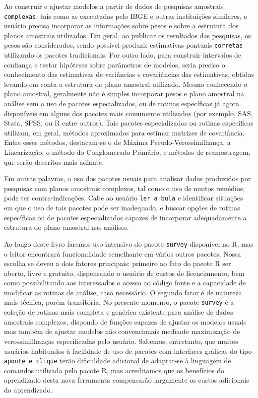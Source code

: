 \documentclass[]{book}
\theoremstyle{definition}
\theoremstyle{definition}
\theoremstyle{definition}
\theoremstyle{remark}
\begin{document}
Ao construir e ajustar modelos a partir de dados de pesquisas amostrais
\texttt{complexas}, tais como as executadas pelo IBGE e outras
instituições similares, o usuário precisa incorporar as informações
sobre pesos e sobre a estrutura dos planos amostrais utilizados. Em
geral, ao publicar os resultados das pesquisas, os pesos são
considerados, sendo possível produzir estimativas pontuais
\texttt{corretas} utilizando os pacotes tradicionais. Por outro lado,
para construir intervalos de confiança e testar hipóteses sobre
parâmetros de modelos, seria preciso o conhecimento das estimativas de
variâncias e covariâncias das estimativas, obtidas levando em conta a
estrutura do plano amostral utilizado. Mesmo conhecendo o plano
amostral, geralmente não é simples incorporar pesos e plano amostral na
análise sem o uso de pacotes especializados, ou de rotinas específicas
já agora disponíveis em alguns dos pacotes mais comumente utilizados
(por exemplo, SAS, Stata, SPSS, ou R entre outros). Tais pacotes
especializados ou rotinas específicas utilizam, em geral, métodos
aproximados para estimar matrizes de covariância. Entre esses métodos,
destacam-se o de Máxima Pseudo-Verossimilhança, a Linearização, o método
do Conglomerado Primário, e métodos de reamostragem, que serão descritos
mais adiante.

Em outras palavras, o uso dos pacotes usuais para analisar dados
produzidos por pesquisas com planos amostrais complexos, tal como o uso
de muitos remédios, pode ter contra-indicações. Cabe ao usuário
\texttt{ler\ a\ bula} e identificar situações em que o uso de tais
pacotes pode ser inadequado, e buscar opções de rotinas específicas ou
de pacotes especializados capazes de incorporar adequadamente a
estrutura do plano amostral nas análises.

Ao longo deste livro faremos uso intensivo do pacote \texttt{survey}
disponível no R, mas o leitor encontrará funcionalidade semelhante em
vários outros pacotes. Nossa escolha se deveu a dois fatores principais:
primeiro ao fato do pacote R ser aberto, livre e gratuito, dispensando o
usuário de custos de licenciamento, bem como possibilitando aos
interessados o acesso ao código fonte e a capacidade de modificar as
rotinas de análise, caso necessário. O segundo fator é de natureza mais
técnica, porém transitória. No presente momento, o pacote
\texttt{survey} é a coleção de rotinas mais completa e genérica
existente para análise de dados amostrais complexos, dispondo de funções
capazes de ajustar os modelos usuais mas também de ajustar modelos não
convencionais mediante maximização de verossimilhanças especificadas
pelo usuário. Sabemos, entretanto, que muitos usuários habituados à
facilidade de uso de pacotes com interfaces gráficas do tipo
\texttt{aponte\ e\ clique} terão dificuldade adicional de adaptar-se à
linguagem de comandos utilizada pelo pacote R, mas acreditamos que os
benefícios do aprendizado desta nova ferramenta compensarão largamente
os custos adicionais do aprendizado.
\end{document}
